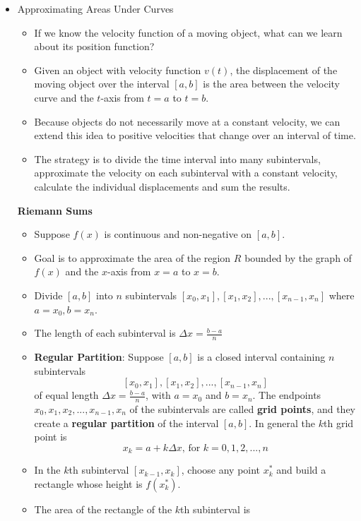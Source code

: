 \documentclass{article}
\begin{document}
\begin{itemize}
\begin{itemize}
    \end{itemize}
    \item Approximating Areas Under Curves
    \begin{itemize}
        \item If we know the velocity function of a moving object, what can we learn about its position function?
        \item Given an object with velocity function $v(t)$, the displacement of the moving object over the interval $[a,b]$ is the area between the velocity curve and the $t$-axis from $t = a$ to $t = b$.
        \item Because objects do not necessarily move at a constant velocity, we can extend this idea to positive velocities that change over an interval of time.
        \item The strategy is to divide the time interval into many subintervals, approximate the velocity on each subinterval with a constant velocity, calculate the individual displacements and sum the results.
    \end{itemize}
    \textbf{Riemann Sums}
    \begin{itemize}
        \item Suppose $f(x)$ is continuous and non-negative on $[a,b]$.
        \item Goal is to approximate the area of the region $R$ bounded by the graph of $f(x)$ and the $x$-axis from $x = a$ to $x = b$.
        \item Divide $[a,b]$ into $n$ subintervals $[x_0,x_1],[x_1,x_2],...,[x_{n-1},x_n]$ where $a = x_0, b = x_n$.
        \item The length of each subinterval is $\Delta x = \frac{b - a}{n}$
        \item \textbf{Regular Partition}: Suppose $[a,b]$ is a closed interval containing $n$ subintervals
            $$[x_0,x_1],[x_1,x_2],...,[x_{n-1},x_n]$$
        of equal length $\Delta x = \frac{b - a}{n}$, with $a = x_0$ and $b = x_n$. The endpoints $x_0, x_1, x_2,...,x_{n - 1},x_n$ of the subintervals are called \textbf{grid points}, and they create a \textbf{regular partition} of the interval $[a,b]$. In general the $k$th grid point is
            $$x_k = a + k\Delta x\text{, for } k = 0,1,2,...,n$$
        \item In the $k$th subinterval $[x_{k - 1}, x_k]$, choose any point $x_k^*$ and build a rectangle whose height is $f(x_k^*)$.
        \item The area of the rectangle of the $k$th subinterval is

\end{itemize}
\end{itemize}
\end{document}
